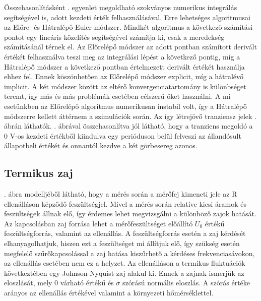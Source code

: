 Összehasonlításként . egyenlet megoldható szokványos numerikus integrálás segítségével is, adott kezdeti érték felhasználásával. Erre lehetséges algoritmusai az Előre- és Hátralépő Euler módszer\cite{euler_method}. Mindkét algoritmus a következő számítási pontot egy lineáris közelítés segítségével számítja ki, csak a meredekség számításánál térnek el. Az Előrelépő módszer az adott pontban számított derivált értékét felhasználva teszi meg az integrálási lépést a következő pontig, míg a Hátralépő módszer a következő pontban értelmezett derivált értékét használja ehhez fel. Ennek köszönhetően az Előrelépő módszer explicit, míg a hátralévő implicit. A két módszer között az eltérő konvergenciatartomány is különbséget teremt, így más és más problémák esetében célszerű őket használni. A mi esetünkben az Előrelépő algoritmus numerikusan instabil volt, így a Hátralépő módszerre kellett áttérnem a szimulációk során. Az így létrejövő tranziensz jelek . ábrán láthatók. . ábrával összehasonlítva jól látható, hogy a tranziens megoldó a 0 V-os kezdeti értékből kiindulva egy perióduson belül felveszi az állandósult állapotbeli értékét és onnantól kezdve a két görbesereg azonos.


\subsection{Termikus zaj}

. ábra modelljéből látható, hogy a mérés során a mérőfej kimeneti jele az R ellenálláson képződő feszültségjel. Mivel a mérés során relatíve kicsi áramok és feszültségek állnak elő, így érdemes lehet megvizsgálni a különböző zajok hatását. Az kapcsolásban zaj forrása lehet a mérőfeszültséget előállító $U_0$ értékű feszültségforrás, valamint az ellenállás. A feszültségforrás esetén a zaj kérdését elhanyagolhatjuk, hiszen ezt a feszültséget mi állítjuk elő, így szükség esetén megfelelő szűrőkapcsolással a zaj hatása kiszűrhető a kérdéses frekvenciasávokon, az ellenállás esetében nem ez a helyzet. Az ellenálláson a termikus fluktuációk következtében egy Johnson-Nyquist zaj alakul ki. Ennek a zajnak ismerjük az eloszlását, mely 0 várható értékű és $\sigma$ szórású normális eloszlás. A szórás értéke arányos az ellenállás értékével valamint a környezeti hőmérséklettel.



